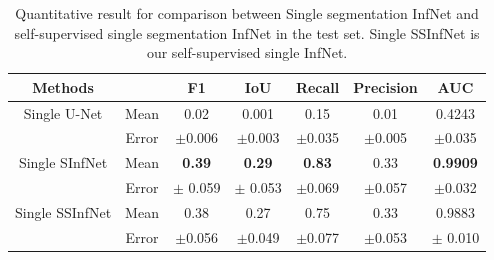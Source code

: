  \begin{table}[!ht]
 	\centering
 	\begin{tabular}{| c | c || c c c c c ||}
 		\hline
 		Methods & & F1 & IoU & Recall & Precision & AUC \\ \hline
 		Single U-Net & Mean & 0.02 & 0.001 & 0.15 & 0.01 & 0.4243 \\ \cline{2-7}
 		& Error & $\pm$0.006 & $\pm$0.003 & $\pm$0.035 & $\pm$0.005 & $\pm$0.035 \\ \hline
 		Single SInfNet &  Mean & \textbf{0.39} & \textbf{0.29} & \textbf{0.83} & 0.33 & \textbf{0.9909} \\ \cline{2-7}
 		& Error & $\pm$ 0.059 & $\pm$ 0.053 & $\pm$0.069 & $\pm$0.057  & $\pm$0.032 \\ \hline
 		Single SSInfNet &  Mean & 0.38 & 0.27 & 0.75 & 0.33 & 0.9883  \\ \cline{2-7}
 		& Error & $\pm$0.056 & $\pm$0.049 &$\pm$0.077  & $\pm$0.053 & $\pm$  0.010 \\ \hline
 	\end{tabular}
 	\caption{Quantitative result for comparison between Single segmentation InfNet and self-supervised single segmentation InfNet in the test set. Single SSInfNet is our self-supervised single InfNet.}
 	\label{tab:single}
 \end{table}


